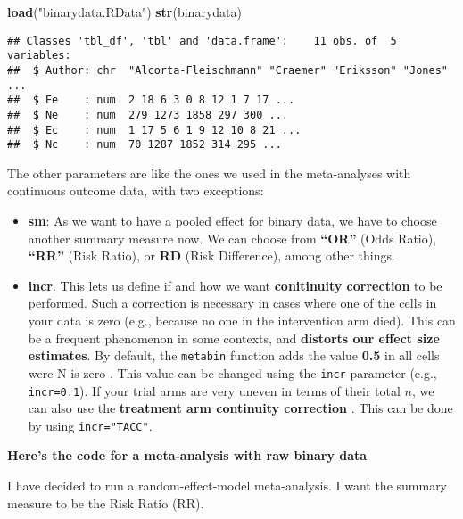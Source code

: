 \documentclass[]{book}
\newenvironment{Shaded}{\begin{snugshade}}{\end{snugshade}}
\newcommand{\KeywordTok}[1]{\textcolor[rgb]{0.13,0.29,0.53}{\textbf{#1}}}
\newcommand{\StringTok}[1]{\textcolor[rgb]{0.31,0.60,0.02}{#1}}
\newcommand{\NormalTok}[1]{#1}
\providecommand{\tightlist}{%
  \setlength{\itemsep}{0pt}\setlength{\parskip}{0pt}}
\theoremstyle{definition}
\theoremstyle{definition}
\theoremstyle{definition}
\theoremstyle{remark}
\begin{document}
\begin{Shaded}
\begin{Highlighting}[]
\KeywordTok{load}\NormalTok{(}\StringTok{"binarydata.RData"}\NormalTok{)}
\KeywordTok{str}\NormalTok{(binarydata)}
\end{Highlighting}
\end{Shaded}

\begin{verbatim}
## Classes 'tbl_df', 'tbl' and 'data.frame':    11 obs. of  5 variables:
##  $ Author: chr  "Alcorta-Fleischmann" "Craemer" "Eriksson" "Jones" ...
##  $ Ee    : num  2 18 6 3 0 8 12 1 7 17 ...
##  $ Ne    : num  279 1273 1858 297 300 ...
##  $ Ec    : num  1 17 5 6 1 9 12 10 8 21 ...
##  $ Nc    : num  70 1287 1852 314 295 ...
\end{verbatim}

The other parameters are like the ones we used in the meta-analyses with
continuous outcome data, with two exceptions:

\begin{itemize}
\tightlist
\item
  \textbf{sm}: As we want to have a pooled effect for binary data, we
  have to choose another summary measure now. We can choose from
  \textbf{``OR''} (Odds Ratio), \textbf{``RR''} (Risk Ratio), or
  \textbf{RD} (Risk Difference), among other things.
\item
  \textbf{incr}. This lets us define if and how we want
  \textbf{conitinuity correction} to be performed. Such a correction is
  necessary in cases where one of the cells in your data is zero (e.g.,
  because no one in the intervention arm died). This can be a frequent
  phenomenon in some contexts, and \textbf{distorts our effect size
  estimates}. By default, the \texttt{metabin} function adds the value
  \textbf{0.5} in all cells were N is zero \citep{gart1967bias}. This
  value can be changed using the \texttt{incr}-parameter (e.g.,
  \texttt{incr=0.1}). If your trial arms are very uneven in terms of
  their total \(n\), we can also use the \textbf{treatment arm
  continuity correction} \citep{j2004add}. This can be done by using
  \texttt{incr="TACC"}.
\end{itemize}

\textbf{Here's the code for a meta-analysis with raw binary data}

I have decided to run a random-effect-model meta-analysis. I want the
summary measure to be the Risk Ratio (RR).
\end{document}
